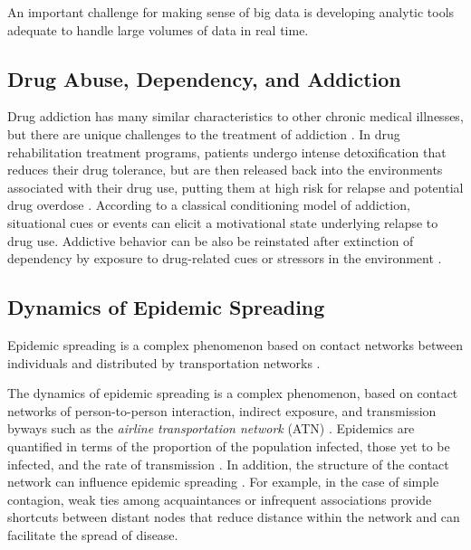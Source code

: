 \documentclass[sigconf]{acmart}
\begin{document}
An important challenge for making sense of big data is developing analytic 
tools adequate to handle large volumes of data in real time.

\subsection{Drug Abuse, Dependency, and Addiction}

Drug addiction has many similar characteristics to other chronic medical 
illnesses, but there are unique challenges to the treatment of addiction
\cite{marsch12, swendson16}. In drug rehabilitation treatment programs, 
patients undergo intense detoxification that reduces their drug tolerance, but 
are then released back into the environments associated with their drug use, 
putting them at high risk for relapse and potential drug overdose 
\cite{johnson11}. According to a classical conditioning model of addiction, 
situational cues or events can elicit a motivational state underlying relapse 
to drug use. Addictive behavior can be also be reinstated after extinction of 
dependency by exposure to drug-related cues or stressors in the environment 
\cite{shaham03}. 


\subsection{Dynamics of Epidemic Spreading}

Epidemic spreading is a complex phenomenon based on contact networks between 
individuals and distributed by transportation networks \cite{Colizza06}.

The dynamics of epidemic spreading is a complex phenomenon, based on contact 
networks of person-to-person interaction, indirect exposure, and transmission 
byways such as the {\it airline transportation network} (ATN) \cite{Colizza06}. 
Epidemics are quantified in terms of the proportion of the population infected, 
those yet to be infected, and the rate of transmission \cite{hethcote00}. In 
addition, the structure of the contact network can influence epidemic spreading 
\cite{pastor01}. For example, in the case of simple contagion, weak ties among 
acquaintances or infrequent associations provide shortcuts between distant nodes 
that reduce distance within the network \cite{granovetter73} and can facilitate 
the spread of disease. 
\end{document}
